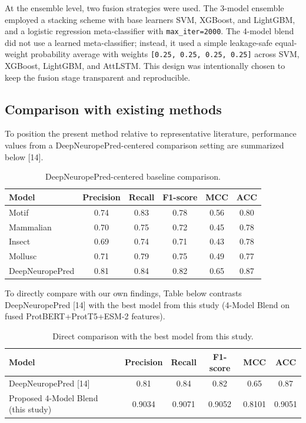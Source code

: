 \documentclass[11pt]{article}
\begin{document}
At the ensemble level, two fusion strategies were used. The 3-model ensemble employed a stacking scheme with base learners SVM, XGBoost, and LightGBM, and a logistic regression meta-classifier with \texttt{max\_iter=2000}. The 4-model blend did not use a learned meta-classifier; instead, it used a simple leakage-safe equal-weight probability average with weights \texttt{[0.25, 0.25, 0.25, 0.25]} across SVM, XGBoost, LightGBM, and AttLSTM. This design was intentionally chosen to keep the fusion stage transparent and reproducible.

\subsection{Comparison with existing methods}
To position the present method relative to representative literature, performance values from a DeepNeuropePred-centered comparison setting are summarized below [14].

\begin{table}[htbp]
\centering
\caption{DeepNeuropePred-centered baseline comparison.}
\begin{tabular}{l c c c c c}
\toprule
Model & Precision & Recall & F1-score & MCC & ACC \\
\midrule
Motif & 0.74 & 0.83 & 0.78 & 0.56 & 0.80 \\
Mammalian & 0.70 & 0.75 & 0.72 & 0.45 & 0.78 \\
Insect & 0.69 & 0.74 & 0.71 & 0.43 & 0.78 \\
Mollusc & 0.71 & 0.79 & 0.75 & 0.49 & 0.77 \\
DeepNeuropePred & 0.81 & 0.84 & 0.82 & 0.65 & 0.87 \\
\bottomrule
\end{tabular}
\end{table}

To directly compare with our own findings, Table below contrasts DeepNeuropePred [14] with the best model from this study (4-Model Blend on fused ProtBERT+ProtT5+ESM-2 features).

\begin{table}[htbp]
\centering
\caption{Direct comparison with the best model from this study.}
\begin{tabular}{l c c c c c}
\toprule
Model & Precision & Recall & F1-score & MCC & ACC \\
\midrule
DeepNeuropePred [14] & 0.81 & 0.84 & 0.82 & 0.65 & 0.87 \\
Proposed 4-Model Blend (this study) & 0.9034 & 0.9071 & 0.9052 & 0.8101 & 0.9051 \\
\bottomrule
\end{tabular}
\end{table}
\end{document}
